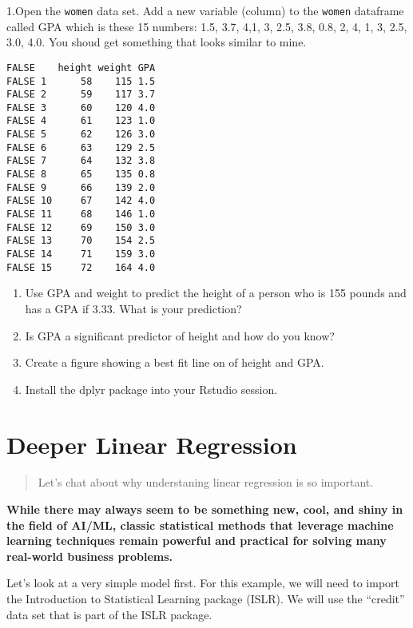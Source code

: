 \documentclass[
]{book}
\begin{document}
1.Open the \texttt{women} data set. Add a new variable (column) to the \texttt{women} dataframe called GPA which is these 15 numbers: 1.5, 3.7, 4,1, 3, 2.5, 3.8, 0.8, 2, 4, 1, 3, 2.5, 3.0, 4.0. You shoud get something that looks similar to mine.

\begin{verbatim}
FALSE    height weight GPA
FALSE 1      58    115 1.5
FALSE 2      59    117 3.7
FALSE 3      60    120 4.0
FALSE 4      61    123 1.0
FALSE 5      62    126 3.0
FALSE 6      63    129 2.5
FALSE 7      64    132 3.8
FALSE 8      65    135 0.8
FALSE 9      66    139 2.0
FALSE 10     67    142 4.0
FALSE 11     68    146 1.0
FALSE 12     69    150 3.0
FALSE 13     70    154 2.5
FALSE 14     71    159 3.0
FALSE 15     72    164 4.0
\end{verbatim}

\begin{enumerate}
\def\labelenumi{\arabic{enumi}.}
\setcounter{enumi}{1}
\item
  Use GPA and weight to predict the height of a person who is 155 pounds and has a GPA if 3.33. What is your prediction?
\item
  Is GPA a significant predictor of height and how do you know?
\item
  Create a figure showing a best fit line on of height and GPA.
\item
  Install the dplyr package into your Rstudio session.
\end{enumerate}

\hypertarget{deeper-linear-regression}{%
\chapter{Deeper Linear Regression}\label{deeper-linear-regression}}

\begin{quote}
Let's chat about why understaning linear regression is so important.
\end{quote}

\textbf{While there may always seem to be something new, cool, and shiny in the field of AI/ML, classic statistical methods that leverage machine learning techniques remain powerful and practical for solving many real-world business problems.}

Let's look at a very simple model first. For this example, we will need to import the Introduction to Statistical Learning package (ISLR). We will use the ``credit'' data set that is part of the ISLR package.
\end{document}
